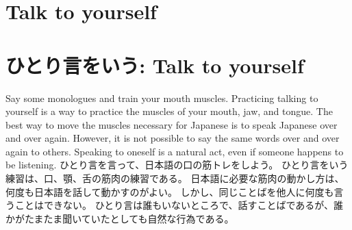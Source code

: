 \documentclass[uplatex,dvipdfmx,b5paper,english,10pt]{jsbook}
\begin{document}

\ifEnglish
\section{Talk to yourself}
\else
\section{ひとり言をいう: Talk to yourself}
\fi


\ifEnglish
Say some monologues and train your mouth muscles.
Practicing talking to yourself is a way to practice the muscles of your mouth, jaw, and tongue.
The best way to move the muscles necessary for Japanese is to speak Japanese over and over again.
However, it is not possible to say the same words over and over again to others.
Speaking to oneself is a natural act, even if someone happens to be listening.
\else
ひとり言を言って、日本語の口の筋トレをしよう。
ひとり言をいう練習は、口、顎、舌の筋肉の練習である。
日本語に必要な筋肉の動かし方は、何度も日本語を話して動かすのがよい。
しかし、同じことばを他人に何度も言うことはできない。
ひとり言は誰もいないところで、話すことばであるが、誰かがたまたま聞いていたとしても自然な行為である。
\fi
\end{document}
